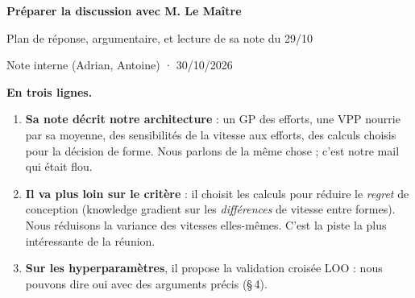 \documentclass[11pt,a4paper]{article}
\begin{document}
{\centering
{\Large\bfseries\color{blue!40!black} Préparer la discussion avec M. Le Maître\par}
\vspace{0.15em}
{\large Plan de réponse, argumentaire, et lecture de sa note du 29/10\par}
\vspace{0.2em}
{\small Note interne (Adrian, Antoine) · 30/10/2026\par}}

\vspace{0.4em}
\textbf{En trois lignes.}
\begin{enumerate}
  \item \textbf{Sa note décrit notre architecture} : un GP des efforts, une VPP nourrie par sa moyenne, des
        sensibilités de la vitesse aux efforts, des calculs choisis pour la décision de forme. Nous parlons
        de la même chose ; c'est notre mail qui était flou.
  \item \textbf{Il va plus loin sur le critère} : il choisit les calculs pour réduire le \emph{regret} de
        conception (knowledge gradient sur les \emph{différences} de vitesse entre formes). Nous réduisons
        la variance des vitesses elles-mêmes. C'est la piste la plus intéressante de la réunion.
  \item \textbf{Sur les hyperparamètres}, il propose la validation croisée LOO : nous pouvons dire oui avec
        des arguments précis (§\,4).
\end{enumerate}

\end{document}

